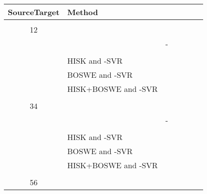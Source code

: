 \documentclass[11pt,a4paper]{article}
\begin{document}
\begin{table*}[!t]
\setlength\tabcolsep{4.5pt}
\begin{center}
\begin{tabular}{clccccc}
\hline
SourceTarget & Method 														& 					&						
																				&					& 					& \\
\hline
\hline
\vspace{-0.9em}\\
12					& \cite{Phandi-EMNLP-2015}							&  					&  				
																				&  					& 					& \\
																				
											& \cite{Dong-EMNLP-2016}								& - 								&  				
																				&  					& 					& \\
\cline{2-7}
\vspace{-0.9em}\\

											& HISK and -SVR										&  					&  				
																				&  	& 					& \\

											& BOSWE and -SVR								&  					&  				
																				&  					& 					& \\

											& HISK+BOSWE and -SVR						&  	&  				
																				&  					& 	& \\
\hline
\vspace{-0.9em}\\
34					& \cite{Phandi-EMNLP-2015}							&  					&  				
																				&  					& 					& \\
																				
											& \cite{Dong-EMNLP-2016}								& - 								&  				
																				&  					& 					& \\
\cline{2-7}
\vspace{-0.9em}\\

											& HISK and -SVR										&  	&  				
																				&  					& 					& \\

											& BOSWE and -SVR								&  					&  				
																				&  					& 					& \\

											& HISK+BOSWE and -SVR						&  					&  				
																				&  	& 	& \\
\hline
\vspace{-0.9em}\\
56					& \cite{Phandi-EMNLP-2015}							&  					&  				
																				&  					& 					& \\
																				

\end{tabular}
\end{center}
\end{table*}
\end{document}
